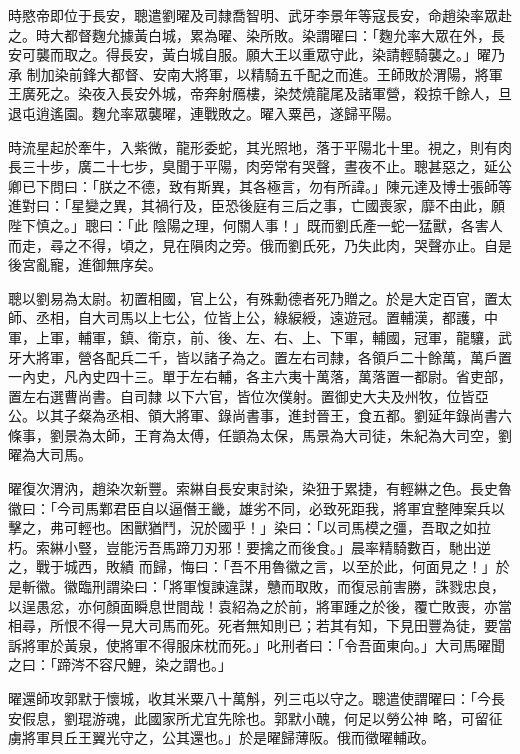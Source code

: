 \begin{pinyinscope}
 時愍帝即位于長安，聰遣劉曜及司隸喬智明、武牙李景年等寇長安，命趙染率眾赴之。時大都督麴允據黃白城，累為曜、染所敗。染謂曜曰：「麴允率大眾在外，長安可襲而取之。得長安，黃白城自服。願大王以重眾守此，染請輕騎襲之。」曜乃承
 制加染前鋒大都督、安南大將軍，以精騎五千配之而進。王師敗於渭陽，將軍王廣死之。染夜入長安外城，帝奔射鴈樓，染焚燒龍尾及諸軍營，殺掠千餘人，旦退屯逍遙園。麴允率眾襲曜，連戰敗之。曜入粟邑，遂歸平陽。



 時流星起於牽牛，入紫微，龍形委蛇，其光照地，落于平陽北十里。視之，則有肉長三十步，廣二十七步，臭聞于平陽，肉旁常有哭聲，晝夜不止。聰甚惡之，延公卿已下問曰：「朕之不德，致有斯異，其各極言，勿有所諱。」陳元達及博士張師等進對曰：「星變之異，其禍行及，臣恐後庭有三后之事，亡國喪家，靡不由此，願陛下慎之。」聰曰：「此
 陰陽之理，何關人事！」既而劉氏產一蛇一猛獸，各害人而走，尋之不得，頃之，見在隕肉之旁。俄而劉氏死，乃失此肉，哭聲亦止。自是後宮亂寵，進御無序矣。



 聰以劉易為太尉。初置相國，官上公，有殊勳德者死乃贈之。於是大定百官，置太師、丞相，自大司馬以上七公，位皆上公，綠綟綬，遠遊冠。置輔漢，都護，中軍，上軍，輔軍，鎮、衛京，前、後、左、右、上、下軍，輔國，冠軍，龍驤，武牙大將軍，營各配兵二千，皆以諸子為之。置左右司隸，各領戶二十餘萬，萬戶置一內史，凡內史四十三。單于左右輔，各主六夷十萬落，萬落置一都尉。省吏部，置左右選曹尚書。自司隸
 以下六官，皆位次僕射。置御史大夫及州牧，位皆亞公。以其子粲為丞相、領大將軍、錄尚書事，進封晉王，食五都。劉延年錄尚書六條事，劉景為太師，王育為太傅，任顗為太保，馬景為大司徒，朱紀為大司空，劉曜為大司馬。



 曜復次渭汭，趙染次新豐。索綝自長安東討染，染狃于累捷，有輕綝之色。長史魯徽曰：「今司馬鄴君臣自以逼僭王畿，雄劣不同，必致死距我，將軍宜整陣案兵以擊之，弗可輕也。困獸猶鬥，況於國乎！」染曰：「以司馬模之彊，吾取之如拉朽。索綝小豎，豈能污吾馬蹄刀刃邪！要擒之而後食。」晨率精騎數百，馳出逆之，戰于城西，敗績
 而歸，悔曰：「吾不用魯徽之言，以至於此，何面見之！」於是斬徽。徽臨刑謂染曰：「將軍愎諫違謀，戇而取敗，而復忌前害勝，誅戮忠良，以逞愚忿，亦何顏面瞬息世間哉！袁紹為之於前，將軍踵之於後，覆亡敗喪，亦當相尋，所恨不得一見大司馬而死。死者無知則已；若其有知，下見田豐為徒，要當訴將軍於黃泉，使將軍不得服床枕而死。」叱刑者曰：「令吾面東向。」大司馬曜聞之曰：「蹄涔不容尺鯉，染之謂也。」



 曜還師攻郭默于懷城，收其米粟八十萬斛，列三屯以守之。聰遣使謂曜曰：「今長安假息，劉琨游魂，此國家所尤宜先除也。郭默小醜，何足以勞公神
 略，可留征虜將軍貝丘王翼光守之，公其還也。」於是曜歸薄阪。俄而徵曜輔政。




\end{pinyinscope}
